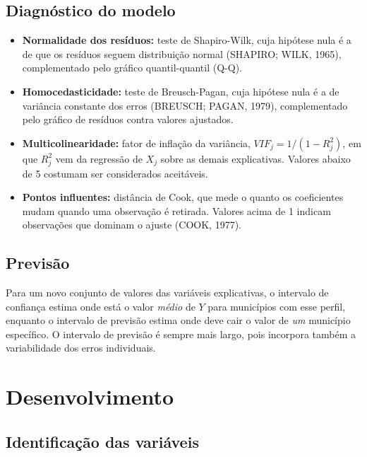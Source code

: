 \documentclass[12pt,a4paper]{article}
\begin{document}
	\subsection{Diagnóstico do modelo}
	
	\begin{itemize}
		\item \textbf{Normalidade dos resíduos:} teste de Shapiro-Wilk, cuja hipótese nula é a de que os resíduos seguem distribuição normal (SHAPIRO; WILK, 1965), complementado pelo gráfico quantil-quantil (Q-Q).
		\item \textbf{Homocedasticidade:} teste de Breusch-Pagan, cuja hipótese nula é a de variância constante dos erros (BREUSCH; PAGAN, 1979), complementado pelo gráfico de resíduos contra valores ajustados.
		\item \textbf{Multicolinearidade:} fator de inflação da variância, $VIF_j = 1/(1-R_j^2)$, em que $R_j^2$ vem da regressão de $X_j$ sobre as demais explicativas. Valores abaixo de 5 costumam ser considerados aceitáveis.
		\item \textbf{Pontos influentes:} distância de Cook, que mede o quanto os coeficientes mudam quando uma observação é retirada. Valores acima de 1 indicam observações que dominam o ajuste (COOK, 1977).
	\end{itemize}
	
	\subsection{Previsão}
	
	Para um novo conjunto de valores das variáveis explicativas, o intervalo de confiança estima onde está o valor \emph{médio} de $Y$ para municípios com esse perfil, enquanto o intervalo de previsão estima onde deve cair o valor de \emph{um} município específico. O intervalo de previsão é sempre mais largo, pois incorpora também a variabilidade dos erros individuais.
	
	\newpage
	
	\section{Desenvolvimento}
	
	\subsection{Identificação das variáveis}
	
\end{document}

